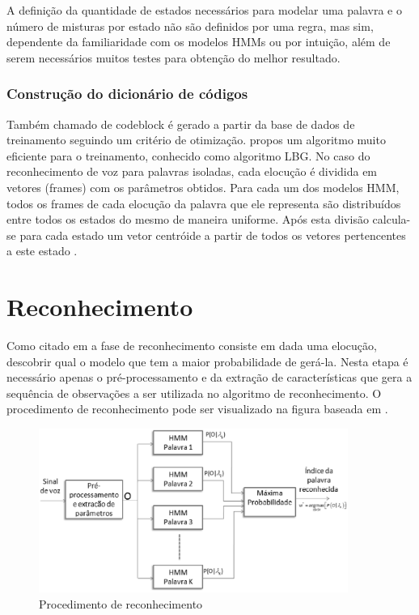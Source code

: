 A definição da quantidade de estados necessários para modelar uma palavra e o número de misturas por estado não são definidos por uma regra, mas sim, dependente da familiaridade com os modelos HMMs ou por intuição, além de serem necessários muitos testes para obtenção do melhor resultado. 

\subsubsection{Construção do dicionário de códigos}
Também chamado de codeblock  é gerado a partir da base de dados de treinamento seguindo um critério de otimização.  propos um algoritmo muito eficiente para o treinamento, conhecido como algoritmo LBG. No caso do reconhecimento de voz para palavras isoladas, cada elocução é dividida em vetores (frames) com os parâmetros obtidos. Para cada um dos modelos HMM, todos os frames de cada elocução da palavra que ele
representa são distribuídos entre todos os estados do mesmo de maneira uniforme. Após esta divisão calcula-se para cada estado um vetor centróide a partir de todos os vetores pertencentes a este estado \cite{RavIsolAnderson}.

\section{Reconhecimento}

Como citado em  a fase de reconhecimento consiste em dada uma elocução, descobrir qual o modelo que tem a maior probabilidade de gerá-la. Nesta etapa é necessário apenas o pré-processamento e da extração de características que gera a sequência de observações a ser utilizada no algoritmo de reconhecimento. O procedimento de
reconhecimento pode ser visualizado na figura baseada em \cite{TutorialHmmRabiner}.

\begin{figure}[H]
\includegraphics[width=0.9\textwidth]{graficos/reconhecimento.eps}
\caption{Procedimento de reconhecimento}
\end{figure}

